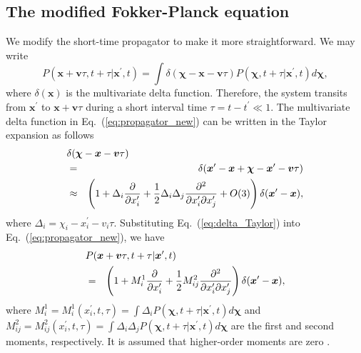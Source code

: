 \documentclass[aps,pre,reprint,superscriptaddress,showpacs,amsmath
,floatfix
]{revtex4-2}
\renewcommand{\vec}[1]{\boldsymbol{#1}}
\newcommand{\eq}[1]{Eq.~(\ref{#1})}
\newcommand{\Order}[1]{O(#1)}
\begin{document}
\subsection{The modified Fokker-Planck equation}
We modify the short-time propagator to make it more straightforward. We may write
\begin{equation}
\label{eq:propagator_new}
P(\vec{x}+\vec{v}\tau,t+\tau|\vec{x}^\prime,t) = \int \delta(\vec{\chi}- \vec{x} -\vec{v}\tau) P(\vec{\chi},t+\tau|\vec{x}^\prime,t) d\vec{\chi},
\end{equation}
where $\delta(\vec{x})$ is the multivariate delta function. Therefore, the system transits from $\vec{x}^\prime$ to $\vec{x}+\vec{v}\tau$ during a short interval time $\tau=t-t^\prime \ll 1$. The multivariate delta function in \eq{eq:propagator_new} can be written in the Taylor expansion as follows
\begin{eqnarray}
\label{eq:delta_Taylor}
\lefteqn{
\delta(\vec{\chi}- \vec{x} -\vec{v}\tau)  } \nonumber\\
&=& \delta(\vec{x}^\prime - \vec{x} + \vec{\chi} -\vec{x}^\prime -\vec{v}\tau) \nonumber\\
&\approx&  \left(1 + \Delta_i \frac{\partial}{\partial x_{i}^\prime}  +\frac{1}{2} \Delta_i \Delta_j \frac{\partial^2 }{\partial x_{i}^\prime \partial x_{j}^\prime }  + \Order{3} \right) \delta(\vec{x}^\prime - \vec{x}),  \nonumber\\
\end{eqnarray}
where $\Delta_i = \chi_{i}-x_{i}^\prime-v_{i}\tau$. Substituting \eq{eq:delta_Taylor} into \eq{eq:propagator_new}, we have
\begin{eqnarray}
\label{eq:FP_KM}
\lefteqn{
P(\vec{x}+\vec{v}\tau,t+\tau|\vec{x}^\prime,t)  } \nonumber\\
&=&  \left(1 + M_i^1 \frac{\partial}{\partial x_{i}^\prime }  + \frac{1}{2} M_{ij}^2 \frac{\partial^2 }{\partial x_{i}^\prime \partial x_{j}^\prime }  \right) \delta(\vec{x}^\prime - \vec{x}),
\end{eqnarray}
where $M_i^1 = M_i^1(x_i^\prime,t,\tau) = \int \Delta_i P(\vec{\chi},t+\tau|\vec{x}^\prime,t) d\vec{\chi}$ and $M_{ij}^2 = M_{ij}^2(x_i^\prime,t,\tau) = \int \Delta_i \Delta_j P(\vec{\chi},t+\tau|\vec{x}^\prime,t) d\vec{\chi}$ are the first and second moments, respectively. It is assumed that higher-order moments are zero \cite{risken1996fokker}. 
\end{document}
